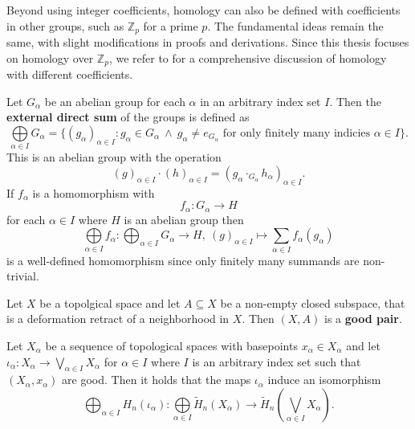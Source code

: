 Beyond using integer coefficients, homology can also be defined with coefficients in other groups, such as \( \mathbb{Z}_p \) for a prime \( p \). The fundamental ideas remain the same, with slight modifications in proofs and derivations. Since this thesis focuses on homology over \( \mathbb{Z}_p \), we refer to \cite[p.~153ff.]{hatcher} for a comprehensive discussion of homology with different coefficients.

\begin{defin}
  Let $G_\alpha$ be an abelian group for each $\alpha$ in an arbitrary index set $I$. Then the \textbf{external direct sum} of the groups is defined as
  \begin{equation*}
    \bigoplus\limits_{\alpha \in I}G_\alpha = \{(g_\alpha)_{\alpha\in I}\colon g_\alpha\in G_\alpha \: \land \: g_\alpha \neq e_{G_\alpha} \text{ for only finitely many indicies } \alpha \in I\}.
  \end{equation*}
  This is an abelian group with the operation \[(g)_{\alpha \in I} \cdot (h)_{\alpha\in I} = (g_\alpha \cdot_{G_\alpha} h_\alpha)_{\alpha \in I}.\]
  If $f_\alpha$ is a homomorphism with \[f_\alpha\colon G_\alpha \to H\]  for each $\alpha \in I$ where $H$ is an abelian group then
  \begin{equation*}
    \bigoplus\limits_{\alpha\in I}f_\alpha\colon \bigoplus_{\alpha \in I} G_\alpha\to H,\: (g)_{\alpha \in I} \mapsto \sum\limits_{\alpha \in I}f_\alpha(g_\alpha)
  \end{equation*}
  is a well-defined homomorphism since only finitely many summands are non-trivial.
\end{defin}

\begin{defin}
  Let $X$ be a topolgical space and let $A \subseteq X$ be a non-empty closed subspace, that is a deformation retract of a neighborhood in $X$. Then $(X, A)$ is a \textbf{good pair}.
\end{defin}

\begin{lemma}\label{lem:holwe}
  Let $X_\alpha$ be a sequence of topological spaces with basepoints $x_\alpha\in X_\alpha$ and let $\iota_\alpha\colon X_\alpha \to \bigvee\limits_{\alpha \in I}X_\alpha$ for $\alpha \in I$ where $I$ is an arbitrary index set such that $(X_\alpha, x_\alpha)$ are good. Then it holds that the maps $\iota_\alpha$ induce an isomorphism
  \begin{equation*}
    \bigoplus_{\alpha \in I}H_n(\iota_\alpha) \colon \bigoplus\limits_{\alpha\in I} \tilde{H}_n(X_\alpha)\to \tilde{H}_n\left(\bigvee\limits_{\alpha\in I} X_\alpha\right).
  \end{equation*}
\end{lemma}

